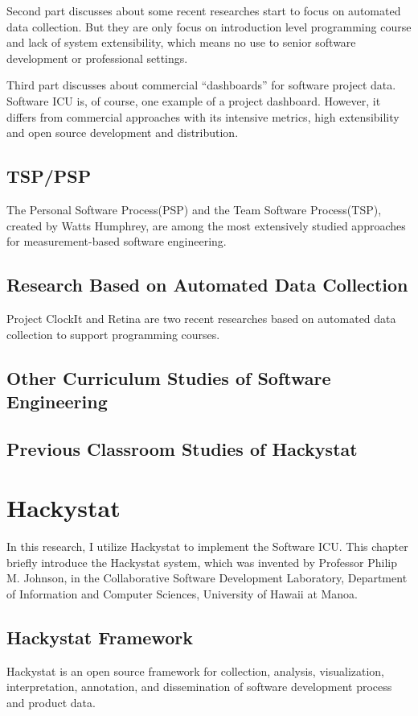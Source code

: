 Second part discusses about some recent researches start to focus on automated data collection. But they are only focus on introduction level programming course and lack of system extensibility, which means no use to senior software development or professional settings. 

Third part discusses about commercial ``dashboards'' for software project data. Software ICU is, of course, one example of a project dashboard. However, it differs from commercial approaches with its intensive metrics, high extensibility and open source development and distribution. 

\section {TSP/PSP}
The Personal Software Process(PSP) and the Team Software Process(TSP), created by Watts Humphrey, are among the most extensively studied approaches for measurement-based software engineering.

\section {Research Based on Automated Data Collection}
Project ClockIt and Retina are two recent researches based on automated data collection to support programming courses.

\section {Other Curriculum Studies of Software Engineering}

\section {Previous Classroom Studies of Hackystat}

\chapter{Hackystat}
In this research, I utilize Hackystat to implement the Software ICU. This chapter briefly introduce the Hackystat system, which was invented by Professor Philip M. Johnson, in the Collaborative Software Development Laboratory, Department of Information and Computer Sciences, University of Hawaii at Manoa. 
 

\section{Hackystat Framework}
Hackystat is an open source framework for collection, analysis, visualization, interpretation, annotation, and dissemination of software development process and product data.

